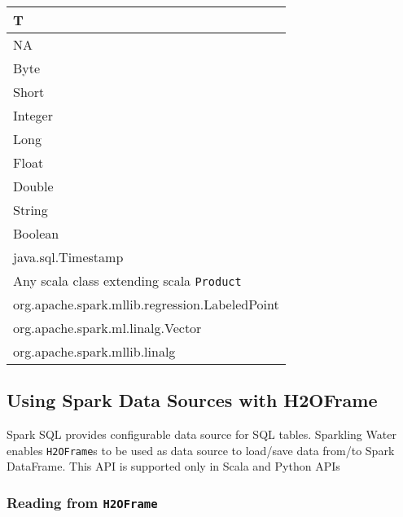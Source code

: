 \documentclass{standalone}
\begin{document}
    \begin{table}[!ht]
        \centering
        \begin{tabular}{l}
            \toprule
            \textbf{T}                                       \\
            \midrule
            NA                                               \\
            Byte                                             \\
            Short                                            \\
            Integer                                          \\
            Long                                             \\
            Float                                            \\
            Double                                           \\
            String                                           \\
            Boolean                                          \\
            java.sql.Timestamp                               \\
            Any scala class extending scala \texttt{Product} \\
            org.apache.spark.mllib.regression.LabeledPoint   \\
            org.apache.spark.ml.linalg.Vector                \\
            org.apache.spark.mllib.linalg                    \\
            \bottomrule
        \end{tabular}
    \end{table}

    \subsection{Using Spark Data Sources with H2OFrame}
    Spark SQL provides configurable data source for SQL tables. Sparkling Water enables \texttt{H2OFrame}s to be
    used as data source to load/save data from/to Spark DataFrame. This API is supported only in Scala and
    Python APIs

    \subsubsection{Reading from \texttt{H2OFrame}}
\end{document}
